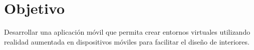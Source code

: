 \section{Objetivo}
Desarrollar una aplicación móvil que permita crear entornos virtuales utilizando realidad aumentada en dispositivos móviles para facilitar el diseño de interiores.